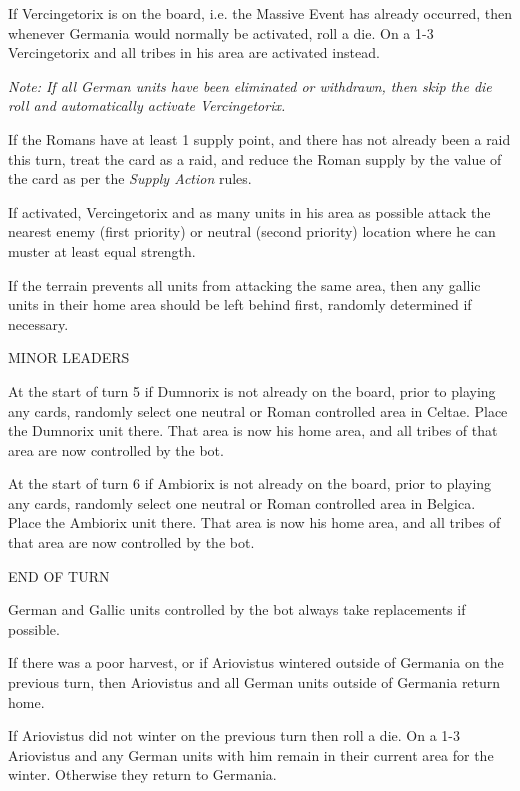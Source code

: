 If Vercingetorix is on the board, i.e. the Massive Event has already occurred, then whenever Germania would normally be activated, roll a die. On a 1-3 Vercingetorix and all tribes in his area are activated instead.
    
\textit{Note: If all German units have been eliminated or withdrawn, then skip the die roll and automatically activate Vercingetorix.}
    
If the Romans have at least 1 supply point, and there has not already been a raid this turn, treat the card as a raid, and reduce the Roman supply by the value of the card as per the \textit{Supply Action} rules.
    
If activated, Vercingetorix and as many units in his area as possible attack the nearest enemy (first priority) or neutral (second priority) location where he can muster at least equal strength.
    
If the terrain prevents all units from attacking the same area, then any gallic units in their home area should be left behind first, randomly determined if necessary.

\label{solitaire:minor_leaders}MINOR LEADERS

At the start of turn 5 if Dumnorix is not already on the board, prior to playing any cards, randomly select one neutral or Roman controlled area in Celtae. Place the Dumnorix unit there. That area is now his home area, and all tribes of that area are now controlled by the bot.

At the start of turn 6 if Ambiorix is not already on the board, prior to playing any cards, randomly select one neutral or Roman controlled area in Belgica. Place the Ambiorix unit there. That area is now his home area, and all tribes of that area are now controlled by the bot.

\label{solitaire:end_of_turn}END OF TURN

German and Gallic units controlled by the bot always take replacements if possible.

If there was a poor harvest, or if Ariovistus wintered outside of Germania on the previous turn, then Ariovistus and all German units outside of Germania return home.
    
If Ariovistus did not winter on the previous turn then roll a die. On a 1-3 Ariovistus and any German units with him remain in their current area for the winter. Otherwise they return to Germania.


